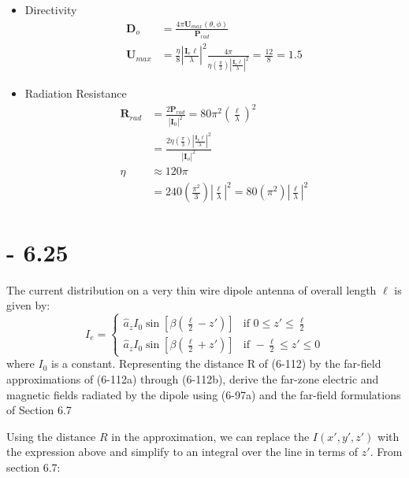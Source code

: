 \documentclass[12pt]{article}
\begin{document}
\begin{itemize}
\item Directivity
  \begin{align*}
    \mathbf{D}_o &=\frac{4\pi\mathbf{U}_{max}(\theta,\phi)}{\mathbf{P}_{rad}} \\
    \mathbf{U}_{max} &= \frac{\eta}{8}\left| \frac{ \bm{I}_e\ell}{\lambda}\right|^2\frac{4\pi}{\eta\left(\frac{\pi}{3}\right)\left|\frac{\mathbf{I}_o\ell}{\lambda}\right|^2} = \frac{12}{8} = 1.5
  \end{align*}
\item Radiation Resistance
  \begin{align*}
    \mathbf{R}_{rad} &=\frac{2\mathbf{P}_{rad}}{|\mathbf{I}_{0}|^2} = 80\pi^2\left(\frac{\ell}{\lambda}\right)^2 \\
                     &= \frac{2\eta\left(\frac{\pi}{3}\right)\left|\frac{\mathbf{I}_o\ell}{\lambda}\right|^2}{|\mathbf{I}_o|^2}\\
    \eta &\approx  120\pi\\
                     &= 240\left(\frac{\pi^2}{3}\right)\left|\frac{\ell}{\lambda}\right|^2 = 80\left(\pi^2\right)\left|\frac{\ell}{\lambda}\right|^2           
  \end{align*}
\end{itemize}

\section{- 6.25}
The current distribution on a very thin wire dipole antenna of overall length $\ell$ is given by:
\[
I_e = 
\begin{cases} 
\hat{a}_z I_0 \sin [\beta\left(\frac{\ell}{2} - z'\right)] & \text{if } 0 \leq z' \leq \frac{\ell}{2} \\
\hat{a}_z I_0 \sin [\beta\left(\frac{\ell}{2} + z'\right)] & \text{if } -\frac{\ell}{2} \leq z' \leq 0
\end{cases}
\]
where $I_0$ is a constant. Representing the distance R of (6-112) by the far-field approximations of (6-112a) through (6-112b), derive the far-zone electric and magnetic fields radiated by the dipole using (6-97a) and the far-field formulations of Section 6.7

Using the distance $R$ in the approximation, we can replace the $I(x',y',z')$ with the expression above and simplify to an integral over the line in terms of $z'$. From section 6.7:
\end{document}
